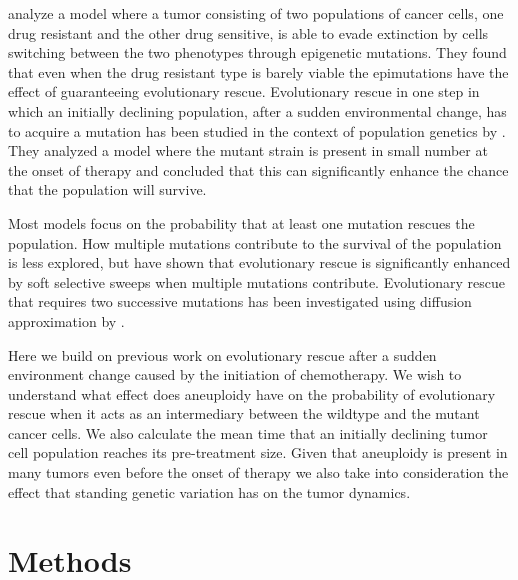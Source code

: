 \documentclass[12pt]{extarticle}
\begin{document}
\citet{gunnarsson2020understanding} analyze a model where a tumor consisting of two populations of cancer cells, one drug resistant and the other drug sensitive, is able to evade extinction by cells switching between the two phenotypes through epigenetic mutations. They found that even when the drug resistant type is barely viable the epimutations have the effect of guaranteeing evolutionary rescue. Evolutionary rescue in one step in which an initially declining population, after a sudden environmental change, has to acquire a mutation has been studied in the context of population genetics  by \citep{orr2008population,orr2014population}. They analyzed a model where the mutant strain is present in small number at the onset of therapy and concluded that this can significantly enhance the chance that the population will survive. 

Most models focus on the probability that at least one mutation rescues the population. How multiple mutations contribute to the survival of the population is less explored, but \citet{wilson2017soft} have shown that evolutionary rescue is significantly enhanced by soft selective sweeps when multiple mutations contribute.  Evolutionary rescue that requires two successive mutations has been investigated using diffusion approximation by \citet{martin2013probability}.

Here we build on previous work on evolutionary rescue after a sudden environment change caused by the initiation of chemotherapy. We wish to understand what effect does aneuploidy have on the probability of evolutionary rescue when it acts as an intermediary between the wildtype and the mutant cancer cells. We also calculate the mean time that an initially declining tumor cell population reaches its pre-treatment size. Given that aneuploidy is present in many tumors even before the onset of therapy \citep{lukow2021chromosomal} we also take into consideration the effect that standing genetic variation has on the tumor dynamics.
\section*{Methods}
\end{document}
